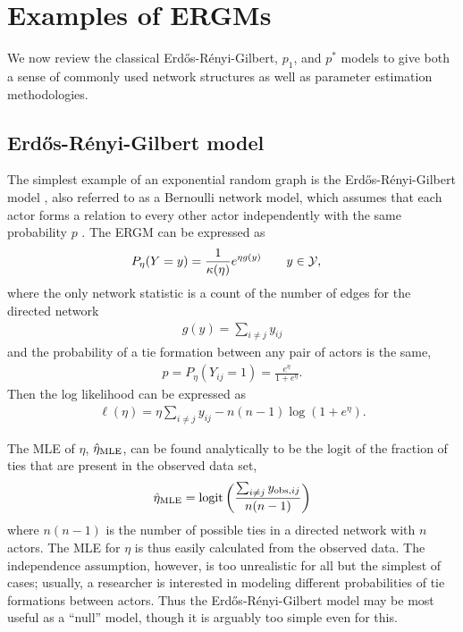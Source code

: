 \section{Examples of ERGMs} \label{S:ERGM examples}
We now review the classical Erd\H{o}s-R\'{e}nyi-Gilbert, $p_1$, and $p^*$ models to give both a sense of commonly used network structures as well as parameter estimation methodologies.

\subsection{Erd\H{o}s-R\'{e}nyi-Gilbert model} \label{S:Erdos}
The simplest example of an exponential random graph is the Erd\H{o}s-R\'{e}nyi-Gilbert 
model \citep{Erdos,Gilbert}, also referred to as a Bernoulli network model, which 
assumes that each actor forms a relation to every other actor independently with the 
same probability $p$ \citep{ergm}.  The ERGM can be expressed as
\begin{align*}
	P_{\eta}(Y=y) &= \frac{1}{\kappa( \eta) }e^{\eta g(y)}  \qquad y \in {\mathcal Y}, 
\end{align*}
where the only network statistic is a count of the number of edges for the directed network
\begin{align*}
	g(y) = \sum_{i \neq j} y_{ij}
\end{align*}
and the probability of a tie formation between any pair of actors is the same,
\begin{align*}
	p = P_\eta( Y_{ij} = 1) = \frac{e^{\eta}}{1+e^{\eta}}.
\end{align*}
Then the log likelihood can be expressed as
\begin{align*}
	\ell(\eta) = \eta \sum_{i \neq j} y_{ij} - n(n-1) \log (1+ e^\eta).
\end{align*}

The MLE of $\eta$, $\hat{\eta}_{\textrm{MLE}}$, can be found analytically to be the logit of the 
fraction of ties that are present in the observed data set, 
\begin{align*}
	\hat{\eta}_{\textrm{MLE}} = \operatorname{logit} \left ( \frac{\sum_{i \neq j} y_{\textrm{obs}, ij}}{ n(n-1) } \right )
\end{align*}
where $n(n-1)$ is the number of possible ties in a directed network with $n$ actors.  
The MLE 
for $\eta$ is thus easily calculated from the observed data. The independence 
assumption, however, is too unrealistic for all but the simplest of cases; usually, 
a researcher is interested in modeling different probabilities of tie formations 
between actors.  Thus the Erd\H{o}s-R\'{e}nyi-Gilbert model may be most 
useful as a ``null'' model, though it is arguably too simple even for this.


